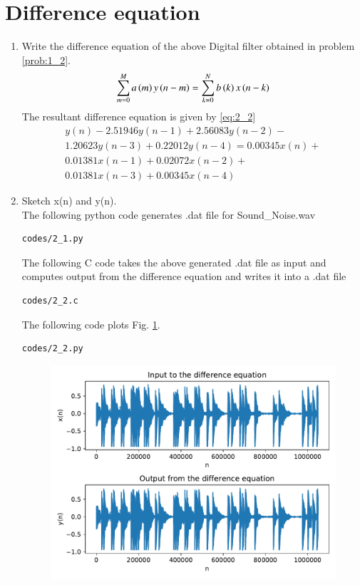 \documentclass[journal,12pt,twocolumn]{IEEEtran}
\renewcommand\thesection{\arabic{section}}
\begin{document}
\section{Difference equation}
\begin{enumerate}[label=\thesection.\arabic*,ref=\thesection.\theenumi]
\item
\label{prob:2_1}
Write the difference equation of the above Digital filter obtained in problem \ref{prob:1_2}.
\\
\solution
\begin{align}
\label{eq:2_1}
 \sum _{m=0}^{M}a\left(m\right)y\left(n-m\right)=\sum _{k=0}^{N}b\left(k\right)x\left(n-k\right)
\end{align}
The resultant difference equation is given by \eqref{eq:2_2}
\begin{align}
\label{eq:2_2}
y(n) - 2.51946y(n-1) + 2.56083y(n-2) - 
\nonumber\\
1.20623y(n-3) + 0.22012y(n-4) = 0.00345x(n) + 
\nonumber\\
0.01381x(n-1) + 0.02072x(n-2) +
\nonumber \\
0.01381x(n-3) + 0.00345x(n-4)
\end{align}
\item
\label{prob:2_2}
Sketch x(n) and y(n).
\\
\solution
The following python code generates .dat file for Sound\_Noise.wav
\begin{lstlisting}
codes/2_1.py
\end{lstlisting}
The following C code takes the above generated .dat file as input and computes output from the difference equation and writes it into a .dat file
\begin{lstlisting}
codes/2_2.c
\end{lstlisting}
The following code plots Fig. \ref{fig:2_2}.
\begin{lstlisting}
codes/2_2.py
\end{lstlisting}

\begin{figure}[!ht]
\begin{center}
\includegraphics[width=\columnwidth]{./figs/2_2}
\end{center}
\label{fig:2_2}	
\end{figure}
\end{enumerate}
\end{document}
